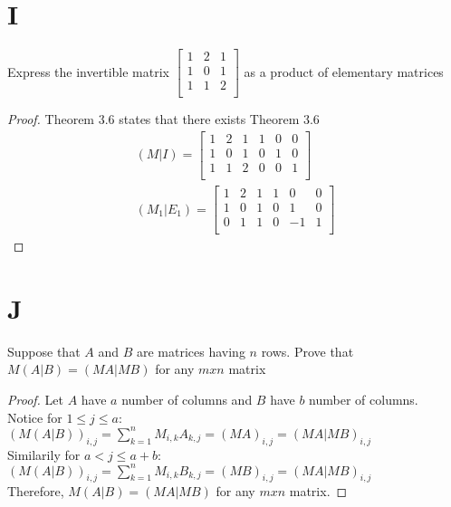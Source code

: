 \documentclass[11pt]{scrartcl}
\begin{document}
\section{I} 
Express the invertible matrix
$
\begin{bmatrix}
1 & 2 & 1\\
1 & 0 & 1 \\ 
1 & 1 & 2 \\ 
\end{bmatrix}
$
as a product of elementary matrices
\begin{proof}
Theorem 3.6 states that there exists
 Theorem 3.6
 \begin{align*}
	(M|I)=
	\left[\begin{array}{ccc|ccc}
	1 & 2 & 1 & 1 & 0 & 0 \\ 
	1 & 0 & 1 & 0 & 1 & 0 \\ 
	1 & 1 & 2 & 0 & 0 & 1 \\ 
	\end{array}\right]\\
	(M_1|E_1)=
	\left[\begin{array}{ccc|ccc}
	1 & 2 & 1 & 1 & 0 & 0 \\ 
	1 & 0 & 1 & 0 & 1 & 0 \\ 
	0 & 1 & 1 & 0 & -1 & 1 \\ 
	\end{array}\right]
\end{align*}
\end{proof}

\section{J}
Suppose that $A$ and $B$ are matrices having $n$ rows. Prove that $M(A|B) = (MA|MB)$ for any $mxn$ matrix
\begin{proof}
Let $A$ have $a$ number of columns and $B$ have $b$ number of columns. \\
Notice for $1 \leq j \leq a$:
$(M(A|B))_{i,j} = \sum_{k=1}^{n} M_{i,k}A_{k,j} = (MA)_{i,j} = (MA|MB)_{i,j}$\\
Similarily for $a < j \leq a + b$:
$(M(A|B))_{i,j} = \sum_{k=1}^{n} M_{i,k}B_{k,j} = (MB)_{i,j} = (MA|MB)_{i,j}$\\
Therefore, $M(A|B) = (MA|MB)$ for any $mxn$ matrix.
\end{proof}
\end{document}
